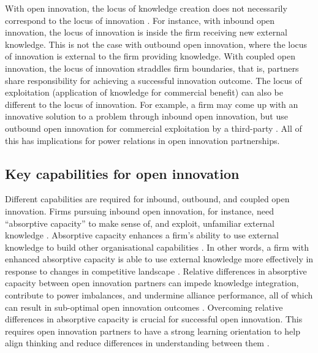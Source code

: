  With open innovation, the locus of knowledge creation does not necessarily correspond to the locus of innovation \citep{gassmann2004towards}. For instance, with inbound open innovation, the locus of innovation is inside the firm receiving new external knowledge. This is not the case with outbound open innovation, where the locus of innovation is external to the firm providing knowledge. With coupled open innovation, the locus of innovation straddles firm boundaries, that is, partners share responsibility for achieving a successful innovation outcome. The locus of exploitation (application of knowledge for commercial benefit) can also be different to the locus of innovation. For example, a firm may come up with an innovative solution to a problem through inbound open innovation, but use outbound open innovation for commercial exploitation by a third-party \citep{gassmann2004towards}. All of this has implications for power relations in open innovation partnerships. \medskip

\subsection{Key capabilities for open innovation}

Different capabilities are required for inbound, outbound, and coupled open innovation. Firms pursuing inbound open innovation, for instance, need \enquote{absorptive capacity} to make sense of, and exploit, unfamiliar external knowledge  \citep{vanhaverbeke2007connecting}. Absorptive capacity enhances a firm’s ability to use external knowledge to build other organisational capabilities \citep{zahra2002absorptive,ambrosini2009dynamic,sun2010examination}. In other words, a firm with enhanced absorptive capacity is able to use external knowledge more effectively in response to changes in competitive landscape \citep{chen2009positive,vasylieva2013absorptive,de2016knowledge}. Relative differences in absorptive capacity between open innovation partners can impede knowledge integration, contribute to power imbalances, and undermine alliance performance, all of which can result in sub-optimal open innovation outcomes \citep{lane1998relative,vanhaverbeke2007connecting,zobel2016benefiting,tell2017managing}. Overcoming relative differences in absorptive capacity is crucial for successful open innovation. This requires open innovation partners to have a strong learning orientation to help align thinking and reduce differences in understanding between them  \citep{nooteboom2000learning,sun2010examination,de2016knowledge}. \medskip

